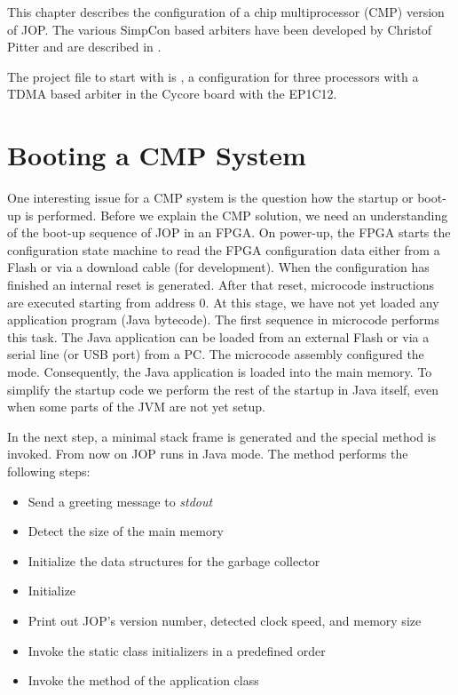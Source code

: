 
This chapter describes the configuration of a chip multiprocessor
(CMP) version of JOP. The various SimpCon based arbiters have been
developed by Christof Pitter and are described in \cite{jop:dma,
jop:cmp, jop:cmp:eval}.

The project file to start with is , a configuration for
three processors with a TDMA based arbiter in the Cycore board with
the EP1C12.

\section{Booting a CMP System}


One interesting issue for a CMP system is the question how the
startup or boot-up is performed. Before we explain the CMP solution,
we need an understanding of the boot-up sequence of JOP in an FPGA.
On power-up, the FPGA starts the configuration state machine to read
the FPGA configuration data either from a Flash or via a download
cable (for development). When the configuration has finished an
internal reset is generated. After that reset, microcode instructions
are executed starting from address 0. At this stage, we have not yet
loaded any application program (Java bytecode). The first sequence in
microcode performs this task. The Java application can be loaded from
an external Flash or via a serial line (or USB port) from a PC. The
microcode assembly configured the mode. Consequently, the Java
application is loaded into the main memory. To simplify the startup
code we perform the rest of the startup in Java itself, even when
some parts of the JVM are not yet setup.

In the next step, a minimal stack frame is generated and the special
method  is invoked. From now on JOP runs in Java
mode. The method  performs the following steps:
\begin{samepage}
\begin{itemize}
    \item Send a greeting message to \emph{stdout}
    \item Detect the size of the main memory
    \item Initialize the data structures for the garbage
        collector
    \item Initialize 
    \item Print out JOP's version number, detected clock speed,
        and memory size
    \item Invoke the static class initializers in a predefined
        order
    \item Invoke the  method of the application class
\end{itemize}
\end{samepage}

